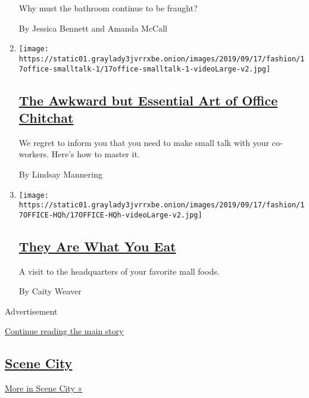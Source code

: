 \begin{enumerate}
  Why must the bathroom continue to be fraught?

  By Jessica Bennett and Amanda McCall
\item
  \texttt{[image: https://static01.graylady3jvrrxbe.onion/images/2019/09/17/fashion/17office-smalltalk-1/17office-smalltalk-1-videoLarge-v2.jpg]}

  \hypertarget{the-awkward-but-essential-art-of-office-chitchat}{%
  \subsection{\texorpdfstring{\href{/2019/09/17/style/the-awkward-art-of-office-small-talk.html}{The
  Awkward but Essential Art of Office
  Chitchat}}{The Awkward but Essential Art of Office Chitchat}}\label{the-awkward-but-essential-art-of-office-chitchat}}

  We regret to inform you that you need to make small talk with your
  co-workers. Here's how to master it.

  By Lindsay Mannering
\item
  \texttt{[image: https://static01.graylady3jvrrxbe.onion/images/2019/09/17/fashion/17OFFICE-HQh/17OFFICE-HQh-videoLarge-v2.jpg]}

  \hypertarget{they-are-what-you-eat}{%
  \subsection{\texorpdfstring{\href{/2019/09/17/style/moes-cinnabon-focus-brands.html}{They
  Are What You
  Eat}}{They Are What You Eat}}\label{they-are-what-you-eat}}

  A visit to the headquarters of your favorite mall foods.

  By Caity Weaver
\end{enumerate}

Advertisement

\protect\hyperlink{after-mid6}{Continue reading the main story}

\hypertarget{scene-city}{%
\subsection{\texorpdfstring{\href{/column/scene-city}{Scene
City}}{Scene City}}\label{scene-city}}

\href{/column/scene-city}{More in Scene City »}

